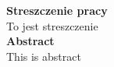 \documentclass[document.tex]{subfiles}
\begin{document}
\clearpage
\begin{flushleft}
\textbf{\Huge{Streszczenie pracy}}
\vspace{0.5cm}
\\
\large{To jest streszczenie}
\\
\vspace{1cm}
\textbf{\Huge{Abstract}}
\vspace{0.5cm}
\\
\large{This is abstract}
\end{flushleft}
\clearpage
\end{document}
